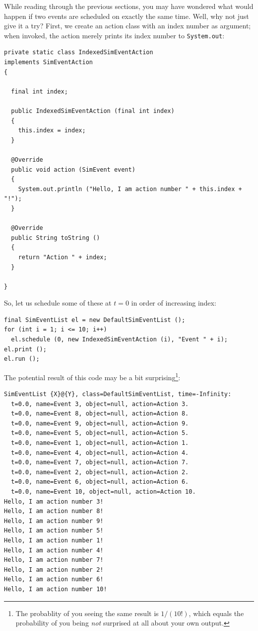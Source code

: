 \documentclass[12pt]{book}
\begin{document}
While reading through the previous sections,
  you may have wondered
  what would happen
  if two events are scheduled
  on exactly the same time.
Well, why not just give it a try?
First, we create an action class with an index number as argument;
  when invoked, the action merely prints its index number
  to \lstinline{System.out}:
\begin{lstlisting}[basicstyle=\tiny]
private static class IndexedSimEventAction
implements SimEventAction
{
  
  final int index;
  
  public IndexedSimEventAction (final int index)
  {
    this.index = index;
  }
  
  @Override
  public void action (SimEvent event)
  {
    System.out.println ("Hello, I am action number " + this.index + "!");
  }

  @Override
  public String toString ()
  {
    return "Action " + index;
  }
  
}
\end{lstlisting}
So, let us schedule some of these at $t=0$
  in order of increasing index:
\begin{lstlisting}[basicstyle=\tiny]
final SimEventList el = new DefaultSimEventList ();
for (int i = 1; i <= 10; i++)
  el.schedule (0, new IndexedSimEventAction (i), "Event " + i);
el.print ();
el.run ();
\end{lstlisting}
The potential result of this code may be a bit surprising\footnote{
The probablity of you seeing the same result is $1/(10!)$,
  which equals the probability
  of you being {\em not\/} surprised at all about your own output.}:
\begin{lstlisting}[basicstyle=\tiny]
SimEventList {X}@{Y}, class=DefaultSimEventList, time=-Infinity:
  t=0.0, name=Event 3, object=null, action=Action 3.
  t=0.0, name=Event 8, object=null, action=Action 8.
  t=0.0, name=Event 9, object=null, action=Action 9.
  t=0.0, name=Event 5, object=null, action=Action 5.
  t=0.0, name=Event 1, object=null, action=Action 1.
  t=0.0, name=Event 4, object=null, action=Action 4.
  t=0.0, name=Event 7, object=null, action=Action 7.
  t=0.0, name=Event 2, object=null, action=Action 2.
  t=0.0, name=Event 6, object=null, action=Action 6.
  t=0.0, name=Event 10, object=null, action=Action 10.
Hello, I am action number 3!
Hello, I am action number 8!
Hello, I am action number 9!
Hello, I am action number 5!
Hello, I am action number 1!
Hello, I am action number 4!
Hello, I am action number 7!
Hello, I am action number 2!
Hello, I am action number 6!
Hello, I am action number 10!
\end{lstlisting}
\end{document}
